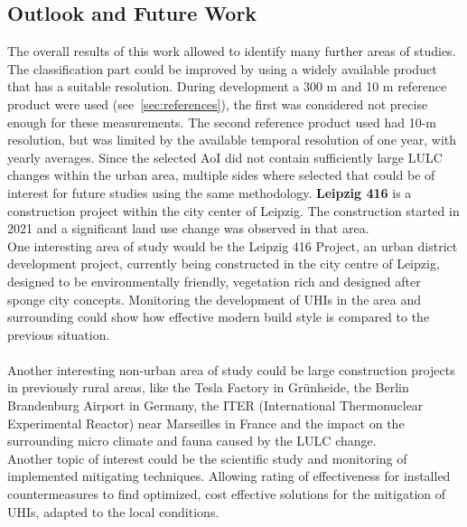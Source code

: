  
\subsection{Outlook and Future Work}\label{sec:future}
The overall results of this work allowed to identify many further areas of studies.
The classification part could be improved by using a widely available product that has a suitable resolution. 
During development a 300 m and 10 m reference product were used (see~\cref{sec:references}), the first was considered not precise enough for these measurements.
The second reference product used had 10-m resolution, but was limited by the available temporal resolution of one year, with yearly averages.
Since the selected \gls{AoI} did not contain sufficiently large \gls{LULC} changes within the urban area, multiple sides where selected that could be of interest for future studies using the same methodology.
\textbf{Leipzig 416} is a construction project within the city center of Leipzig.
The construction started in 2021 and a significant land use change was observed in that area. \\
One interesting area of study would be the Leipzig 416 Project, an urban district development project, currently being constructed in the city centre of Leipzig, designed to be environmentally friendly, vegetation rich and designed after sponge city concepts.
Monitoring the development of \glspl{UHI} in the area and surrounding could show how effective modern build style is compared to the previous situation.\\
\\
Another interesting non-urban area of study could be large construction projects in previously rural areas, like the Tesla Factory in Grünheide, the Berlin Brandenburg Airport in Germany, the ITER (International Thermonuclear Experimental Reactor) near Marseilles in France and the impact on the surrounding micro climate and fauna caused by the \gls{LULC} change.
\\
Another topic of interest could be the scientific study and monitoring of implemented mitigating techniques.
Allowing rating of effectiveness for installed countermeasures to find optimized, cost effective solutions for the mitigation of \glspl{UHI}, adapted to the local conditions.

